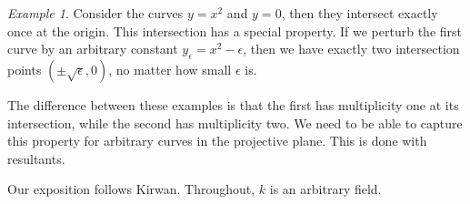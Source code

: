 \documentclass{article}
\theoremstyle{remark}
\newtheorem{example}{Example}[section]
\begin{document}
\begin{example} Consider the curves $y=x^2$ and $y=0$, then they intersect exactly once at the origin. This intersection has a special property. If we perturb the first curve by an arbitrary constant $y_{\epsilon}=x^2 -  \epsilon$, then we have exactly two intersection points $(\pm\sqrt{\epsilon},0)$, no matter how small $\epsilon$ is.\\
\end{example}

The difference between these examples is that the first has multiplicity one at its intersection, while the second has multiplicity two. We need to be able to capture this property for arbitrary curves in the projective plane. This is done with resultants.

Our exposition follows Kirwan. Throughout, $k$ is an arbitrary field.
\end{document}
